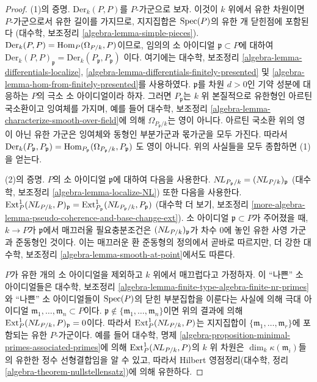 \begin{proof}
(1)의 증명. $\text{Der}_k(P, P)$를 $P$-가군으로 보자. 이것이 $k$ 위에서
유한 차원이면 $P$-가군으로서 유한 길이를 가지므로, 지지집합은
$\mathop{\mathrm{Spec}}(P)$의 유한 개 닫힌점에 포함된다
(대수학, 보조정리 \ref{algebra-lemma-simple-pieces}).
$\text{Der}_k(P, P) = \mathop{\mathrm{Hom}}\nolimits_P(\Omega_{P/k}, P)$이므로, 임의의 소 아이디얼
$\mathfrak p \subset P$에 대하여
$\text{Der}_k(P, P)_\mathfrak p = \text{Der}_k(P_\mathfrak p, P_\mathfrak p)$
이다. 여기에는 대수학, 보조정리
\ref{algebra-lemma-differentials-localize},
\ref{algebra-lemma-differentials-finitely-presented} 및
\ref{algebra-lemma-hom-from-finitely-presented}를 사용하였다.
$\mathfrak p$를 차원 $d > 0$인 기약 성분에 대응하는 $P$의 극소
소 아이디얼이라 하자. 그러면 $P_\mathfrak p$는 $k$ 위 본질적으로
유한형인 아르틴 국소환이고 잉여체를 가지며,%
예를 들어 대수학, 보조정리
\ref{algebra-lemma-characterize-smooth-over-field}에 의해
$\Omega_{P_\mathfrak p/k}$는 영이 아니다. 아르틴 국소환 위의 영이 아닌
유한 가군은 잉여체와 동형인 부분가군과 몫가군을 모두 가진다. 따라서
$\text{Der}_k(P_\mathfrak p, P_\mathfrak p) =
\mathop{\mathrm{Hom}}\nolimits_{P_\mathfrak p}(\Omega_{P_\mathfrak p/k}, P_\mathfrak p)$
도 영이 아니다. 위의 사실들을 모두 종합하면 (1)을 얻는다.

\medskip\noindent
(2)의 증명. $P$의 소 아이디얼 $\mathfrak p$에 대하여 다음을 사용한다.
$\mathop{N\!L}\nolimits_{P_\mathfrak p/k} = (\mathop{N\!L}\nolimits_{P/k})_\mathfrak p$
(대수학, 보조정리 \ref{algebra-lemma-localize-NL}) 또한 다음을 사용한다.
$\text{Ext}_P^1(\mathop{N\!L}\nolimits_{P/k}, P)_\mathfrak p =
\text{Ext}_{P_\mathfrak p}^1(\mathop{N\!L}\nolimits_{P_\mathfrak p/k}, P_\mathfrak p)$
(대수학 더 보기, 보조정리
\ref{more-algebra-lemma-pseudo-coherence-and-base-change-ext}).
소 아이디얼 $\mathfrak p \subset P$가 주어졌을 때, $k \to P$가
$\mathfrak p$에서 매끄러울 필요충분조건은 $(\mathop{N\!L}\nolimits_{P/k})_\mathfrak p$가
차수 $0$에 놓인 유한 사영 가군과 준동형인 것이다. 이는 매끄러운 환
준동형의 정의에서 곧바로 따르지만, 더 강한 대수학, 보조정리
\ref{algebra-lemma-smooth-at-point}에서도 따른다.

\medskip\noindent
$P$가 유한 개의 소 아이디얼을 제외하고 $k$ 위에서 매끄럽다고 가정하자.
이 ``나쁜'' 소 아이디얼들은 대수학, 보조정리
\ref{algebra-lemma-finite-type-algebra-finite-nr-primes}와 ``나쁜''
소 아이디얼들이 $\mathop{\mathrm{Spec}}(P)$의 닫힌 부분집합을 이룬다는 사실에 의해
극대 아이디얼 $\mathfrak m_1, \ldots, \mathfrak m_n \subset P$이다.
$\mathfrak p \not \in \{\mathfrak m_1, \ldots, \mathfrak m_n\}$이면 위의
결과에 의해 $\text{Ext}^1_P(\mathop{N\!L}\nolimits_{P/k}, P)_\mathfrak p = 0$이다. 따라서
$\text{Ext}^1_P(\mathop{N\!L}\nolimits_{P/k}, P)$는 지지집합이
$\{\mathfrak m_1, \ldots, \mathfrak m_r\}$에 포함되는 유한
$P$-가군이다.%
예를 들어 대수학, 명제
\ref{algebra-proposition-minimal-primes-associated-primes}에 의해
$\text{Ext}^1_P(\mathop{N\!L}\nolimits_{P/k}, P)$의 $k$ 위 차원은
$\dim_k \kappa(\mathfrak m_i)$들의 유한한 정수 선형결합임을 알 수 있고,
따라서 Hilbert 영점정리(대수학, 정리
\ref{algebra-theorem-nullstellensatz})에 의해 유한하다.
\end{proof}

